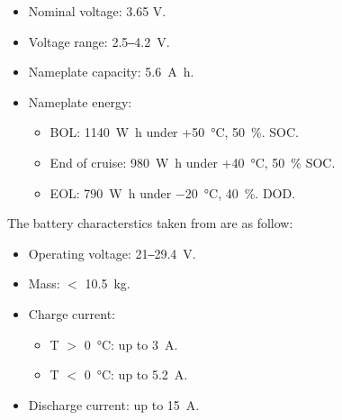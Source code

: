 \begin{itemize}
    \item Nominal voltage: 3.65 \si{\volt}.
    \item Voltage range: 2.5‒\SI{4.2}{\volt}.
    \item Nameplate capacity: \SI{5.6}{\ampere\hour}.
    \item Nameplate energy:
    \begin{itemize}
        \item \ac{BOL}: \SI{1140}{\watt\hour}  under +\SI{50}{\celsius}, \SI{50}{\percent}. \ac{SOC}.
        \item End of cruise: \SI{980}{\watt\hour} under +\SI{40}{\celsius}, \SI{50}{\percent} \ac{SOC}.
        \item \ac{EOL}: \SI{790}{\watt\hour} under \SI{-20}{\celsius}, \SI{40}{\percent}. \ac{DOD}.
    \end{itemize}
\end{itemize}

The battery characterstics taken from  are as follow:

\begin{itemize}
    \item Operating voltage: 21‒\SI{29.4}{\volt}.
    \item Mass: $<$ \SI{10.5}{\kilo\gram}.
    \item Charge current:
    \begin{itemize}
        \item T $>$ \SI{0}{\celsius}: up to \SI{3}{\ampere}.
        \item T $<$ \SI{0}{\celsius}: up to \SI{5.2}{\ampere}.
    \end{itemize}
    \item Discharge current:  up to \SI{15}{\ampere}.
\end{itemize}
